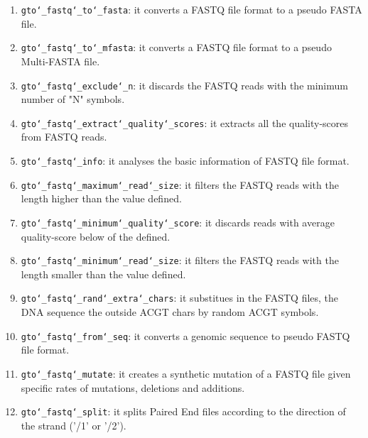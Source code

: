 \begin{enumerate}

\item \texttt{gto\char`_fastq\char`_to\char`_fasta}: it converts a FASTQ file format to a pseudo FASTA file.

\item \texttt{gto\char`_fastq\char`_to\char`_mfasta}: it converts a FASTQ file format to a pseudo Multi-FASTA file.

\item \texttt{gto\char`_fastq\char`_exclude\char`_n}: it discards the FASTQ reads with the minimum number of "N" symbols.

\item \texttt{gto\char`_fastq\char`_extract\char`_quality\char`_scores}: it extracts all the quality-scores from FASTQ reads.

\item \texttt{gto\char`_fastq\char`_info}: it analyses the basic information of FASTQ file format.

\item \texttt{gto\char`_fastq\char`_maximum\char`_read\char`_size}: it filters the FASTQ reads with the length higher than the value defined.

\item \texttt{gto\char`_fastq\char`_minimum\char`_quality\char`_score}: it discards reads with average quality-score below of the defined.

\item \texttt{gto\char`_fastq\char`_minimum\char`_read\char`_size}: it filters the FASTQ reads with the length smaller than the value defined.

\item \texttt{gto\char`_fastq\char`_rand\char`_extra\char`_chars}: it substitues in the FASTQ files, the DNA sequence the outside ACGT chars by random ACGT symbols.

\item \texttt{gto\char`_fastq\char`_from\char`_seq}: it converts a genomic sequence to pseudo FASTQ file format.

\item \texttt{gto\char`_fastq\char`_mutate}: it creates a synthetic mutation of a FASTQ file given specific rates of mutations, deletions and additions.

\item \texttt{gto\char`_fastq\char`_split}: it splits Paired End files according to the direction of the strand ('/1' or '/2').


\end{enumerate}

